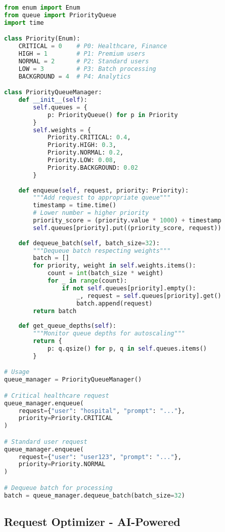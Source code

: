 \documentclass[12pt,a4paper]{article}
\begin{document}
\begin{lstlisting}[language=python, caption=Implémentation Priority Queue Manager]
from enum import Enum
from queue import PriorityQueue
import time

class Priority(Enum):
    CRITICAL = 0    # P0: Healthcare, Finance
    HIGH = 1        # P1: Premium users
    NORMAL = 2      # P2: Standard users
    LOW = 3         # P3: Batch processing
    BACKGROUND = 4  # P4: Analytics

class PriorityQueueManager:
    def __init__(self):
        self.queues = {
            p: PriorityQueue() for p in Priority
        }
        self.weights = {
            Priority.CRITICAL: 0.4,
            Priority.HIGH: 0.3,
            Priority.NORMAL: 0.2,
            Priority.LOW: 0.08,
            Priority.BACKGROUND: 0.02
        }
    
    def enqueue(self, request, priority: Priority):
        """Add request to appropriate queue"""
        timestamp = time.time()
        # Lower number = higher priority
        priority_score = (priority.value * 1000) + timestamp
        self.queues[priority].put((priority_score, request))
    
    def dequeue_batch(self, batch_size=32):
        """Dequeue batch respecting weights"""
        batch = []
        for priority, weight in self.weights.items():
            count = int(batch_size * weight)
            for _ in range(count):
                if not self.queues[priority].empty():
                    _, request = self.queues[priority].get()
                    batch.append(request)
        return batch
    
    def get_queue_depths(self):
        """Monitor queue depths for autoscaling"""
        return {
            p: q.qsize() for p, q in self.queues.items()
        }

# Usage
queue_manager = PriorityQueueManager()

# Critical healthcare request
queue_manager.enqueue(
    request={"user": "hospital", "prompt": "..."},
    priority=Priority.CRITICAL
)

# Standard user request
queue_manager.enqueue(
    request={"user": "user123", "prompt": "..."},
    priority=Priority.NORMAL
)

# Dequeue batch for processing
batch = queue_manager.dequeue_batch(batch_size=32)
\end{lstlisting}

\newpage
\subsection{Request Optimizer - AI-Powered}
\end{document}
